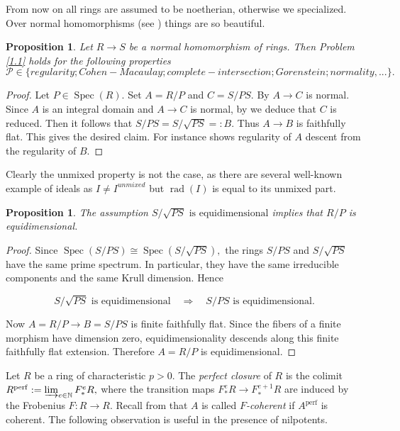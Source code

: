 \documentclass[10pt,a4paper]{amsart}
\newtheorem{proposition}[theorem]{Proposition}
\theoremstyle{definition}
\theoremstyle{remark}
\newcommand{\rad}{\operatorname{rad}}
\begin{document}
 





From now on all rings are assumed  to be noetherian, otherwise we specialized.
Over normal homomorphisms (see \cite[Definition 19.0.1]{HS}) things are so beautiful.
\begin{proposition}\label{n}
	Let \(R\to S\) be a normal homomorphism of rings. Then Problem \ref{1.1} holds for the following properties$$\mathcal P
	\in\{regularity; Cohen-Macaulay; complete-intersection; Gorenstein; normality,...\}.$$
\end{proposition}


\begin{proof} Let
	\(P\in\operatorname{Spec}(R)\). Set
	$A=R/P$ and $C=S/PS.$ By \cite[19.1.2]{HS} $A\to C$ is normal. Since $A$ is an integral domain and
	$A\to C$ is normal, by \cite[19.1.2]{HS} we deduce that $C$ is reduced. Then it follows that
$
	S/PS=S/\sqrt{PS}=:B.
 $
	Thus \(A\to B\) is  faithfully flat.
	This gives the desired claim. For instance \cite[2.2.12]{BH} shows regularity  of $A$ descent from the regularity of $B$.
\end{proof}



Clearly the unmixed property is not the case, as there are several well-known example of ideals as $I\neq I^{unmixed}$ but $\rad(I)$ is equal to its unmixed part.
\begin{proposition}
	The assumption  $S/\sqrt{PS}\text{ is equidimensional}
	$ implies that
	$R/P$ is equidimensional.
\end{proposition}

\begin{proof}
	Since
	$
	\operatorname{Spec}(S/PS)
	\cong
	\operatorname{Spec}(S/\sqrt{PS}),
	$ the rings \(S/PS\) and \(S/\sqrt{PS}\) have the same prime spectrum.
	In particular, they have the same irreducible components and the same
	Krull dimension. Hence
	
	$$
	S/\sqrt{PS}\text{ is equidimensional}
	\quad\Longrightarrow\quad
	S/PS\text{ is equidimensional}.
	$$
	
	Now \(A=R/P\to B=S/PS\) is finite faithfully flat. Since the fibers of a
	finite morphism have dimension zero, equidimensionality descends along
	this finite faithfully flat extension. Therefore \(A=R/P\) is
	equidimensional.
\end{proof}


 	Let \(R\) be a ring of characteristic \(p>0\). The \emph{perfect closure} of \(R\)
is the colimit
\(
R^{\mathrm{perf}}
:=
\varinjlim_{e\in\mathbb N} F_*^e R,
\)
where the transition maps \(F_*^e R\to F_*^{e+1}R\) are induced by the Frobenius
\(F\colon R\to R\).
Recall from \cite{Shi10} that $A$ is called \emph{$F$-coherent} if \(A^{\mathrm{perf}}\) is coherent.
The following observation is useful in the presence of nilpotents.
\end{document}
